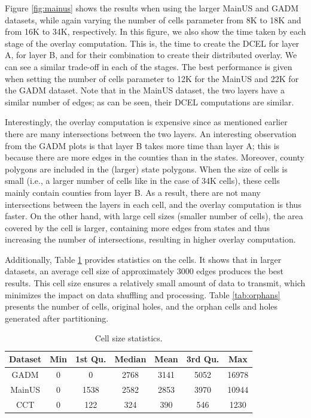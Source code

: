 Figure \ref{fig:mainus} shows the results when using the larger MainUS and GADM datasets, while again varying the number of cells parameter from 8K to 18K and from 16K to 34K, respectively. In this figure, we also show the time taken by each stage of the overlay computation.  This is, the time to create the DCEL for layer A, for layer B, and for their combination to create their distributed overlay. We can see a similar trade-off in each of the stages. The best performance is given when setting the number of cells parameter to 12K for the MainUS and 22K for the GADM dataset. Note that in the MainUS dataset, the two layers have a similar number of edges; as can be seen, their DCEL computations are similar.

Interestingly, the overlay computation is expensive since as mentioned earlier there are many intersections between the two layers. An interesting observation from the GADM plots is that layer B takes more time than layer A; this is because there are more edges in the counties than in the states. Moreover, county polygons are included in the (larger) state polygons. When the size of cells is small (i.e., a larger number of cells like in the case of 34K cells), these cells mainly contain counties from layer B. As a result, there are not many intersections between the layers in each cell, and the overlay computation is thus faster. On the other hand, with large cell sizes (smaller number of cells), the area covered by the cell is larger, containing more edges from states and thus increasing the number of intersections, resulting in higher overlay computation.

Additionally, Table \ref{tab:cell_stats} provides statistics on the cells. It shows that in larger datasets, an average cell size of approximately 3000 edges produces the best results. This cell size ensures a relatively small amount of data to transmit, which minimizes the impact on data shuffling and processing.  Table \ref{tab:orphans} presents the number of cells, original holes, and the orphan cells and holes generated after partitioning.

\begin{table}
    \centering
    \caption{Cell size statistics.}
    \label{tab:cell_stats}
    \begin{tabular}{ccccccc}
        \toprule
        Dataset & Min & 1st Qu. & Median & Mean & 3rd Qu. & Max   \\
        \midrule
        GADM    & 0   & 0       & 2768   & 3141 & 5052    & 16978 \\
        MainUS  & 0   & 1538    & 2582   & 2853 & 3970    & 10944 \\
        CCT     & 0   & 122     & 324    & 390  & 546     & 1230  \\
        \bottomrule
    \end{tabular}
\end{table}

